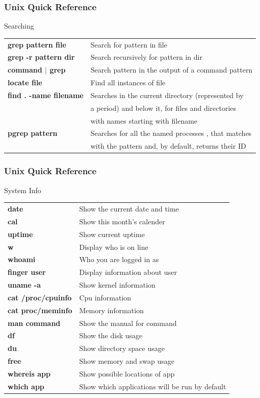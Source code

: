 \documentclass[10pt, hyperref={unicode=true,pdfusetitle, bookmarks=true,bookmarksnumbered=false,bookmarksopen=false, breaklinks=false,pdfborder={0 0 1},backref=true,colorlinks=true,linkcolor=darkblue,pageanchor}]{beamer}
\begin{document}
\begin{frame}
\frametitle{Unix Quick Reference}
\begin{block}{Searching}

\begin{tabular}{ll}
\textbf{grep pattern file}     & Search for pattern in file                                  \tabularnewline
\textbf{grep -r pattern dir}   & Search recursively for pattern in dir                       \tabularnewline
\textbf{command $|$ grep}        & Search pattern in the output of a command pattern         \tabularnewline
\textbf{locate file}           & Find all instances of file                                  \tabularnewline
\textbf{find . -name filename} & Searches in the current directory (represented by           \tabularnewline
                               & a period) and below it, for files and directories           \tabularnewline
                               & with names starting with filename                           \tabularnewline
\textbf{pgrep pattern}         & Searches for all the named processes , that matches         \tabularnewline
                               & with the pattern and, by default, returns their ID          \tabularnewline
\end{tabular}

\end{block}
\end{frame}
\begin{frame}
\frametitle{Unix Quick Reference}
\begin{block}{System Info}

\begin{tabular}{ll}
\textbf{date}   & Show the current date and time                \tabularnewline
\textbf{cal}    & Show this month's calender                    \tabularnewline
\textbf{uptime} & Show current uptime                           \tabularnewline
\textbf{w}      & Display who is on line                        \tabularnewline
\textbf{whoami} & Who you are logged in as                      \tabularnewline
\textbf{finger user}      & Display information about user                      \tabularnewline
\textbf{uname -a}      & Show kernel information                                \tabularnewline
\textbf{cat /proc/cpuinfo}      & Cpu information                               \tabularnewline
\textbf{cat proc/meminfo}      & Memory information                             \tabularnewline
\textbf{man command}      & Show the manual for command                         \tabularnewline
\textbf{df}      & Show the disk usage                                          \tabularnewline
\textbf{du}      & Show directory space usage                                   \tabularnewline
\textbf{free}      & Show memory and swap usage                                 \tabularnewline
\textbf{whereis app}      & Show possible locations of app                      \tabularnewline
\textbf{which app}      & Show which applications will be run by default        \tabularnewline
\end{tabular}

\end{block}
\end{frame}
\end{document}
